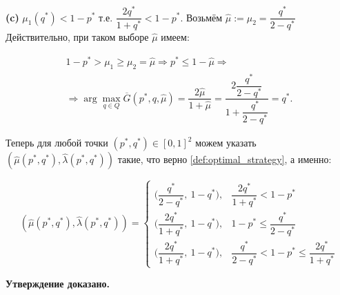 \textbf{(c)} 
$\mu_1(q^*) < 1 - p^*$ т.е. $\dfrac{2 q^*}{1 + q^*} < 1 - p^*$.
Возьмём $\hat \mu := \mu_2 = \dfrac{q^*}{2 - q^*}$
Действительно, при таком выборе $\hat \mu$ имеем:

\begin{gather*}
	1 - p^* > \mu_1 \geqslant \mu_2 = \hat \mu \Rightarrow
	p^* \leqslant 1 - \hat \mu \Rightarrow 
	\\	
	\Rightarrow \arg \max \limits_{q \in Q} \overline G(p^*, q, \hat \mu) =
	\dfrac{2 \hat \mu}{1 + \hat \mu} =
	\dfrac{2 \dfrac{q^*}{2 - q^*}}{1 + \dfrac{q^*}{2 - q^*}} =
	q^*.
\end{gather*}

Теперь для любой точки $(p^*,q^*) \in [0,1]^2$ можем указать
$(\hat \mu(p^*,q^*), \hat \lambda(p^*,q^*))$ такие, что верно \eqref{def:optimal_strategy},
а именно:
 
$$
(\hat \mu(p^*,q^*), \hat \lambda(p^*,q^*)) = 
\begin{cases}
	\Big(\dfrac{q^*}{2 - q^*}, \: 1 - q^* \Big), &
	\dfrac{2 q^*}{1 + q^*} < 1 - p^*
	\\
	\Big(\dfrac{2 q^*}{1 + q^*}, \: 1 - q^* \Big), &
	1 - p^* \leqslant \dfrac{q^*}{2 - q^*}
	\\
	\Big(\dfrac{2 q^*}{1 + q^*}, \: 1 - q^*\Big), & 	
	\dfrac{q^*}{2 - q^{*}} < 1 - p^* \leqslant \dfrac{2 q^*}{1 + q^*}
\end{cases}
$$

\textbf{Утверждение доказано.}
